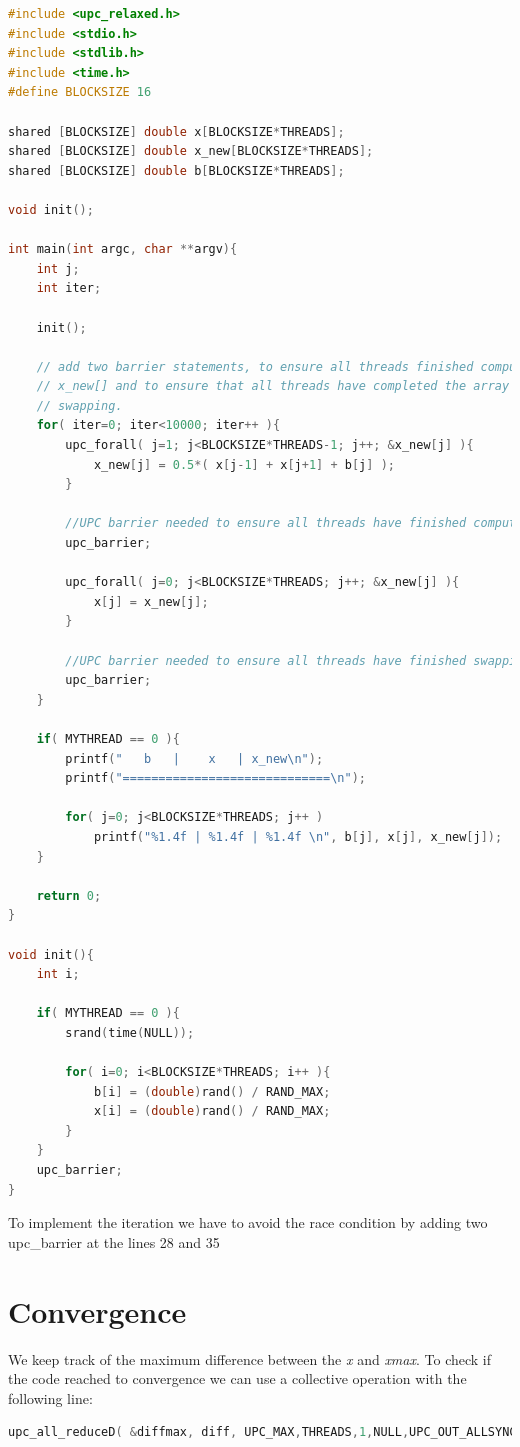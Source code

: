 \documentclass{report}
\begin{document}
\begin{lstlisting}[language=c]
#include <upc_relaxed.h>
#include <stdio.h>
#include <stdlib.h>
#include <time.h>
#define BLOCKSIZE 16

shared [BLOCKSIZE] double x[BLOCKSIZE*THREADS];
shared [BLOCKSIZE] double x_new[BLOCKSIZE*THREADS];
shared [BLOCKSIZE] double b[BLOCKSIZE*THREADS];

void init();

int main(int argc, char **argv){
    int j;
    int iter;

    init();

    // add two barrier statements, to ensure all threads finished computing
    // x_new[] and to ensure that all threads have completed the array
    // swapping.
    for( iter=0; iter<10000; iter++ ){
        upc_forall( j=1; j<BLOCKSIZE*THREADS-1; j++; &x_new[j] ){
            x_new[j] = 0.5*( x[j-1] + x[j+1] + b[j] );
        }

        //UPC barrier needed to ensure all threads have finished computing x_new[]
        upc_barrier;

        upc_forall( j=0; j<BLOCKSIZE*THREADS; j++; &x_new[j] ){
            x[j] = x_new[j];
        }

        //UPC barrier needed to ensure all threads have finished swapping x[] and x_new[]
        upc_barrier;
    }

    if( MYTHREAD == 0 ){
        printf("   b   |    x   | x_new\n");
        printf("=============================\n");

        for( j=0; j<BLOCKSIZE*THREADS; j++ )
            printf("%1.4f | %1.4f | %1.4f \n", b[j], x[j], x_new[j]);
    }

    return 0;
}

void init(){
    int i;

    if( MYTHREAD == 0 ){
        srand(time(NULL));

        for( i=0; i<BLOCKSIZE*THREADS; i++ ){
            b[i] = (double)rand() / RAND_MAX;
            x[i] = (double)rand() / RAND_MAX;
        }
    }
    upc_barrier;
}

\end{lstlisting}

To implement the iteration we have to avoid the race condition by adding two upc\_barrier at the lines 28 and 35

\section{Convergence}
We keep track of the maximum difference between the \textit{x} and \textit{xmax}.
To check if the code reached to convergence we can use a collective operation with the following line:
\begin{lstlisting}[language=c]
upc_all_reduceD( &diffmax, diff, UPC_MAX,THREADS,1,NULL,UPC_OUT_ALLSYNC);
\end{lstlisting}
\end{document}
